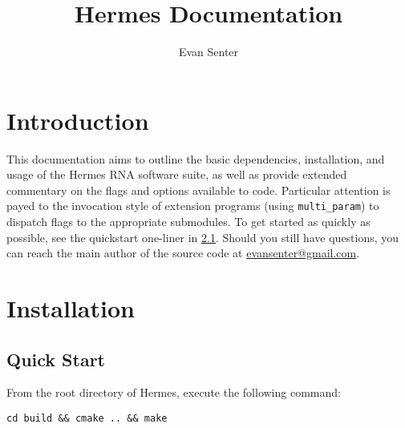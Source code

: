 \documentclass[11pt]{article}
\begin{document}
\newcommand{
\sectionLabel}[2] {
\section{#1} \label{sec:#2} }
\newcommand{
\subsectionLabel}[2] {
\subsection{#1} \label{sub:#2} }
\newcommand{\fixedWidthInList}[4] {
\item[\texttt{#1} \textnormal{#2} \url{#3}] \hfill \\
#4 }
\newcommand{\optionListItem}[2] {\item[\optionFlag{#1}] #2}
\newcommand{\optionFlag}[1] {\ttt{-#1/-\MakeUppercase{#1}}}
\newcommand{\ttt}[1]{{\tt #1}\xspace}
\newcommand{\hermes}{\ttt{hermes}}
\newcommand{\multiParam}{\ttt{multi\_param}}
\newcommand{\fft}{\ttt{FFTbor2D}}
\newcommand{\rnamfpt}{\ttt{RNAmfpt}}
\newcommand{\rnaeq}{\ttt{RNAeq}}
\newcommand{\fftmfpt}{\ttt{FFTmfpt}}
\newcommand{\ffteq}{\ttt{FFTeq}}
\newcommand{\rateeq}{\ttt{RateEq}}
\newcommand{\s}{$s$\xspace}
\newcommand{\A}{$A$\xspace}
\newcommand{\B}{$B$\xspace}
\newcommand{\req}{{\em requried}}

\title{Hermes Documentation}
\author{Evan Senter}

\maketitle
\tableofcontents \clearpage

\sectionLabel{Introduction}{intro}

This documentation aims to outline the basic dependencies, installation, and usage of the Hermes RNA software suite, as well as provide extended commentary on the flags and options available to code. Particular attention is payed to the invocation style of extension programs (using \multiParam) to dispatch flags to the appropriate submodules. To get started as quickly as possible, see the quickstart one-liner in \ref{sub:quickstart}. Should you still have questions, you can reach the main author of the source code at \href{mailto:evansenter@gmail.com}{evansenter@gmail.com}.

\sectionLabel{Installation}{install}

\subsectionLabel{Quick Start}{quickstart}

From the root directory of Hermes, execute the following command:

{\tt cd build \&\& cmake .. \&\& make}
\end{document}
